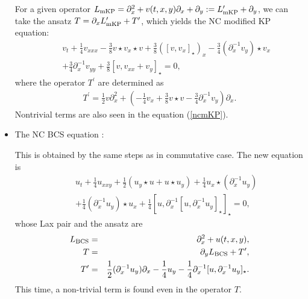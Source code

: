 \documentclass[a4paper,12pt]{article}\setlength{\topmargin}{-1cm}
\begin{document}
\begin{itemize}
For a given operator $L_{\scriptsize\mbox{mKP}}
=\partial_x^2+v(t,x,y)\partial_x+\partial_y 
:=L_{\scriptsize\mbox{mKP}}^\prime+\partial_y$,
we can take the ansatz $T=\partial_x L_{\scriptsize\mbox{mKP}}^\prime+T^\prime$,
which yields the NC modified KP equation:
\begin{eqnarray}
&&v_t+\frac{1}{4}v_{xxx}-\frac{3}{8}v \star v_x\star v
+\frac{3}{8}([v,v_x]_\star)_x
-\frac{3}{4}(\partial_x^{-1}v_y)\star v_x\nonumber\\
&&+\frac{3}{4}\partial_x^{-1}v_{yy}
+\frac{3}{8}[v,v_{xx}+v_y]_\star=0,
\label{ncmKP}
\end{eqnarray}
where the operator $T^\prime$ are determined as
\begin{eqnarray}
T^\prime = \frac{1}{2}v\partial_x^2 
+ \left(-\frac{1}{4}v_x + \frac{3}{8}v\star v - \frac{3}{4}\partial_x^{-1}v_y
\right) \partial_x. 
\end{eqnarray}
Nontrivial terms are also seen in the equation (\ref{ncmKP}).


\item The NC BCS equation 
:

This is obtained by the same steps as in commutative case.
The new equation is 
\begin{eqnarray}
&&u_t+\frac{1}{4}u_{xxy}+\frac{1}{2}(u_y\star u+u\star u_y)
+\frac{1}{4}u_x\star (\partial_x^{-1} u_y)\nonumber\\
&&+\frac{1}{4}(\partial_x^{-1}u_{y})\star u_x
+\frac{1}{4}[u,\partial_x^{-1}[u,\partial_x^{-1}u_{y}]_\star]_\star=0,
\end{eqnarray}
whose Lax pair and the ansatz are
\begin{eqnarray}
L_{\scriptsize\mbox{BCS}}&=&\partial_x^2+u(t,x,y),\nonumber\\
T&=&\partial_y L_{\scriptsize\mbox{BCS}}+T^\prime,\\
T^\prime&=&\frac{1}{2}(\partial_x^{-1}u_y)\partial_x
-\frac{1}{4}u_y-\frac{1}{4}\partial_x^{-1}[u,\partial_x^{-1}u_y]_\star.
\end{eqnarray}
This time, a non-trivial term is found even in the operator $T$.

\end{itemize}
\end{document}
